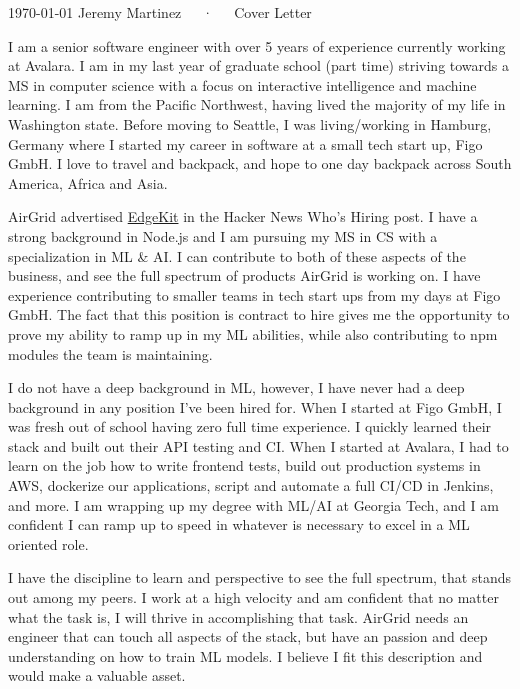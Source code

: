 \documentclass[11pt, a4paper]{awesome-cv}
\begin{document}
\makecvheader[R]

\makecvfooter
  {\today}
  {Jeremy Martinez~~~·~~~Cover Letter}
  {}

\makelettertitle

\begin{cvletter}

I am a senior software engineer with over 5 years of experience currently working at Avalara. I am in my last year of graduate school (part time) striving towards a MS in computer science with a focus on interactive intelligence and machine learning. I am from the Pacific Northwest, having lived the majority of my life in Washington state. Before moving to Seattle, I was living/working in Hamburg, Germany where I started my career in software at a small tech start up, Figo GmbH. I love to travel and backpack, and hope to one day backpack across South America, Africa and Asia.

AirGrid advertised \hyperlink{https://edgekit.org/}{EdgeKit} in the Hacker News Who's Hiring post. I have a strong background in Node.js and I am pursuing my MS in CS with a specialization in ML & AI. I can contribute to both of these aspects of the business, and see the full spectrum of products AirGrid is working on. I have experience contributing to smaller teams in tech start ups from my days at Figo GmbH. The fact that this position is contract to hire gives me the opportunity to prove my ability to ramp up in my ML abilities, while also contributing to npm modules the team is maintaining.

I do not have a deep background in ML, however, I have never had a deep background in any position I've been hired for. When I started at Figo GmbH, I was fresh out of school having zero full time experience. I quickly learned their stack and built out their API testing and CI. When I started at Avalara, I had to learn on the job how to write frontend tests, build out production systems in AWS, dockerize our applications, script and automate a full CI/CD in Jenkins, and more. I am wrapping up my degree with ML/AI at Georgia Tech, and I am confident I can ramp up to speed in whatever is necessary to excel in a ML oriented role.

I have the discipline to learn and perspective to see the full spectrum, that stands out among my peers. I work at a high velocity and am confident that no matter what the task is, I will thrive in accomplishing that task. AirGrid needs an engineer that can touch all aspects of the stack, but have an passion and deep understanding on how to train ML models. I believe I fit this description and would make a valuable asset.

\end{cvletter}


\makeletterclosing
\end{document}
